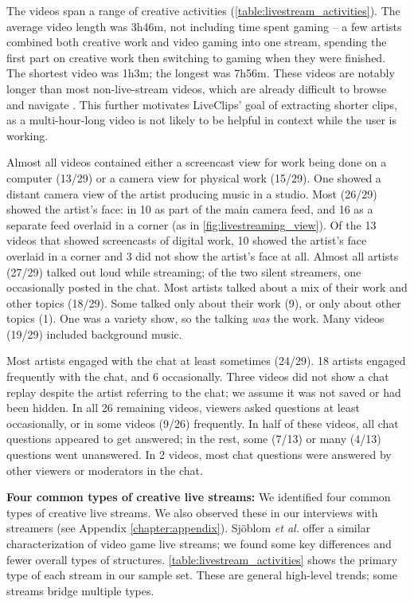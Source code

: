 The videos span a range of creative activities (\autoref{table:livestream_activities}). The average video length was 3h46m, not including time spent gaming -- a few artists combined both creative work and video gaming into one stream, spending the first part on creative work then switching to gaming when they were finished. The shortest video was 1h3m; the longest was 7h56m. These videos are notably longer than most non-live-stream videos, which are already difficult to browse and navigate \cite{Chi2012, Pongnumkul2011, Nguyen2015}. This further motivates LiveClips' goal of extracting shorter clips, as a multi-hour-long video is not likely to be helpful in context while the user is working.

Almost all videos contained either a screencast view for work being done on a computer (13/29) or a camera view for physical work (15/29). One showed a distant camera view of the artist producing music in a studio. Most (26/29) showed the artist's face: in 10 as part of the main camera feed, and 16 as a separate feed overlaid in a corner (as in \autoref{fig:livestreaming_view}). Of the 13 videos that showed screencasts of digital work, 10 showed the artist's face overlaid in a corner and 3 did not show the artist's face at all. Almost all artists (27/29) talked out loud while streaming; of the two silent streamers, one occasionally posted in the chat. Most artists talked about a mix of their work and other topics (18/29). Some talked only about their work (9), or only about other topics (1). One was a variety show, so the talking \textit{was} the work. Many videos (19/29) included background music. 

Most artists engaged with the chat at least sometimes (24/29). 18 artists engaged frequently with the chat, and 6 occasionally. Three videos did not show a chat replay despite the artist referring to the chat; we assume it was not saved or had been hidden. In all 26 remaining videos, viewers asked questions at least occasionally, or in some videos (9/26) frequently. In half of these videos, all chat questions appeared to get answered; in the rest, some (7/13) or many (4/13) questions went unanswered. In 2 videos, most chat questions were answered by other viewers or moderators in the chat.

\textbf{Four common types of creative live streams:}
We identified four common types of creative live streams. We also observed these in our interviews with streamers (see Appendix \ref{chapter:appendix}). Sj{\"{o}}blom \textit{et al.} \cite{Sjoblom2017a} offer a similar characterization of video game live streams; we found some key differences and fewer overall types of structures. \autoref{table:livestream_activities} shows the primary type of each stream in our sample set. These are general high-level trends; some streams bridge multiple types.

